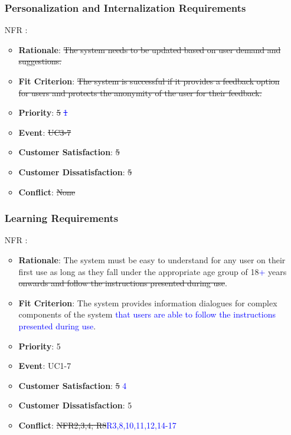 \documentclass[12pt, titlepage]{article}
\newcounter{reqnum} %
\newcounter{freqnum} %
\begin{document}
\begin{itemize}
\subsubsection{Personalization and Internalization Requirements}

\item[NFR\refstepcounter{freqnum}\thefreqnum
\label{NFR}:] 
\begin{itemize}
    \item \textbf{Rationale}: \sout{The system needs to be updated based on user demand and suggestions.}
    \item \textbf{Fit Criterion}: \sout{The system is successful if it provides a feedback option for users and protects the anonymity of the user for their feedback.}
    \item \textbf{Priority}: \sout{5} \textcolor{blue}{\sout{1}}
    \item \textbf{Event}: \sout{UC3-7}%
    \item \textbf{Customer Satisfaction}: \sout{5}
    \item \textbf{Customer Dissatisfaction}: \sout{5}
    \item \textbf{Conflict}: \sout{None}
\end{itemize}
\subsubsection{Learning Requirements}

\item[NFR\refstepcounter{freqnum}\thefreqnum
\label{NFR}:] 
\begin{itemize}
    \item \textbf{Rationale}: The system must be easy to understand for any user on their first use as long as they fall under the appropriate age group of 18\textcolor{blue}{+} years \sout{onwards and follow the instructions presented during use}.
    \item \textbf{Fit Criterion}: The system provides information dialogues for complex components of the system \textcolor{blue}{that users are able to follow the instructions presented during use}.
    \item \textbf{Priority}: 5
    \item \textbf{Event}: UC1-7 %
    \item \textbf{Customer Satisfaction}: \sout{5} \textcolor{blue}{4}
    \item \textbf{Customer Dissatisfaction}: 5
    \item \textbf{Conflict}: \sout{NFR2,3,4; R8}\textcolor{blue}{R3,8,10,11,12,14-17}
\end{itemize}

\end{itemize}
\end{document}
